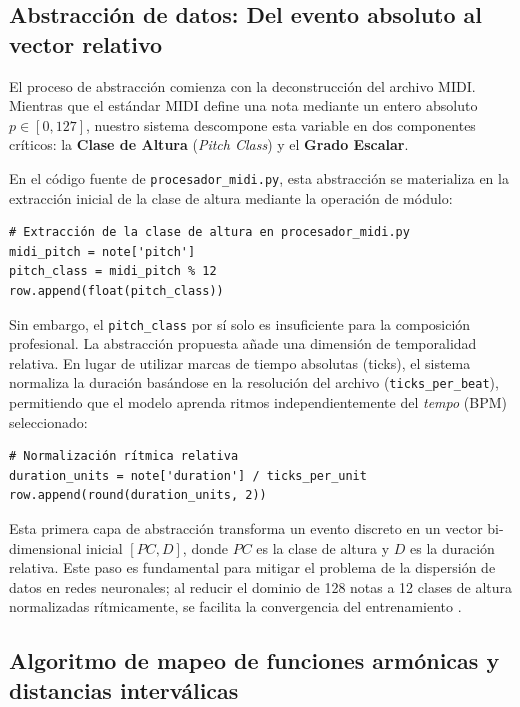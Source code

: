 \documentclass[12pt]{report}
\begin{document}
\subsection{Abstracción de datos: Del evento absoluto al vector relativo}

El proceso de abstracción comienza con la deconstrucción del archivo MIDI. Mientras que el estándar MIDI define una nota mediante un entero absoluto $p \in [0, 127]$, nuestro sistema descompone esta variable en dos componentes críticos: la \textbf{Clase de Altura} (\textit{Pitch Class}) y el \textbf{Grado Escalar}.

En el código fuente de \texttt{procesador\_midi.py}, esta abstracción se materializa en la extracción inicial de la clase de altura mediante la operación de módulo:

\begin{verbatim}
# Extracción de la clase de altura en procesador_midi.py
midi_pitch = note['pitch']
pitch_class = midi_pitch % 12
row.append(float(pitch_class))
\end{verbatim}

Sin embargo, el \texttt{pitch\_class} por sí solo es insuficiente para la composición profesional. La abstracción propuesta añade una dimensión de temporalidad relativa. En lugar de utilizar marcas de tiempo absolutas (ticks), el sistema normaliza la duración basándose en la resolución del archivo (\texttt{ticks\_per\_beat}), permitiendo que el modelo aprenda ritmos independientemente del \textit{tempo} (BPM) seleccionado:

\begin{verbatim}
# Normalización rítmica relativa
duration_units = note['duration'] / ticks_per_unit
row.append(round(duration_units, 2))
\end{verbatim}

Esta primera capa de abstracción transforma un evento discreto en un vector bi-dimensional inicial $[PC, D]$, donde $PC$ es la clase de altura y $D$ es la duración relativa. Este paso es fundamental para mitigar el problema de la dispersión de datos en redes neuronales; al reducir el dominio de 128 notas a 12 clases de altura normalizadas rítmicamente, se facilita la convergencia del entrenamiento \cite{briot2020deep}.

\subsection{Algoritmo de mapeo de funciones armónicas y distancias interválicas}
\end{document}
